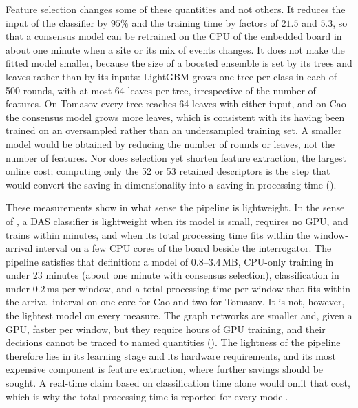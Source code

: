 Feature selection changes some of these quantities and not others. It reduces the input of the classifier by $95\%$ and the training time by factors of $21.5$ and $5.3$, so that a consensus model can be retrained on the CPU of the embedded board in about one minute when a site or its mix of events changes. It does not make the fitted model smaller, because the size of a boosted ensemble is set by its trees and leaves rather than by its inputs: LightGBM grows one tree per class in each of 500 rounds, with at most 64 leaves per tree, irrespective of the number of features. On Tomasov every tree reaches 64 leaves with either input, and on Cao the consensus model grows more leaves, which is consistent with its having been trained on an oversampled rather than an undersampled training set. A smaller model would be obtained by reducing the number of rounds or leaves, not the number of features. Nor does selection yet shorten feature extraction, the largest online cost; computing only the 52 or 53 retained descriptors is the step that would convert the saving in dimensionality into a saving in processing time ().

These measurements show in what sense the pipeline is lightweight. In the sense of , a DAS classifier is lightweight when its model is small, requires no GPU, and trains within minutes, and when its total processing time fits within the window-arrival interval on a few CPU cores of the board beside the interrogator. The pipeline satisfies that definition: a model of $0.8$--$3.4$\,MB, CPU-only training in under 23 minutes (about one minute with consensus selection), classification in under $0.2$\,ms per window, and a total processing time per window that fits within the arrival interval on one core for Cao and two for Tomasov. It is not, however, the lightest model on every measure. The graph networks are smaller and, given a GPU, faster per window, but they require hours of GPU training, and their decisions cannot be traced to named quantities (). The lightness of the pipeline therefore lies in its learning stage and its hardware requirements, and its most expensive component is feature extraction, where further savings should be sought. A real-time claim based on classification time alone would omit that cost, which is why the total processing time is reported for every model.

